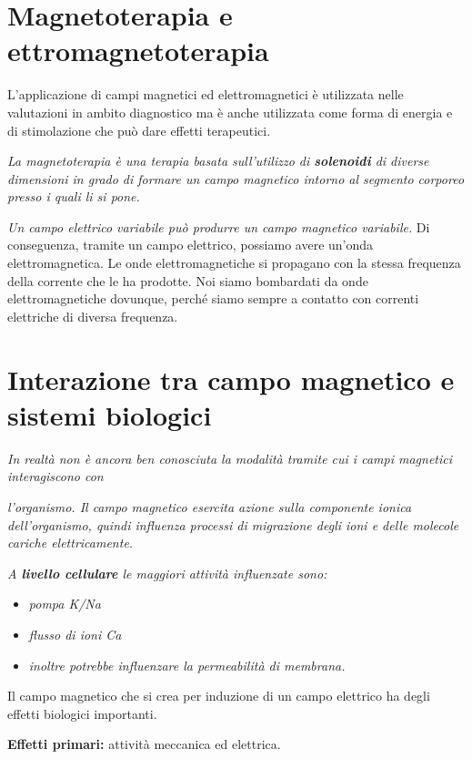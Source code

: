 \section{Magnetoterapia e ettromagnetoterapia}

L'applicazione di campi magnetici ed elettromagnetici è utilizzata nelle
valutazioni in ambito diagnostico ma è anche utilizzata come forma di
energia e di stimolazione che può dare effetti terapeutici.

\emph{La magnetoterapia è una terapia basata sull'utilizzo di
\textbf{solenoidi} di diverse dimensioni in grado di formare un campo
magnetico intorno al segmento corporeo presso i quali li si pone.}

\emph{Un campo elettrico variabile può produrre un campo magnetico
variabile.} Di conseguenza, tramite un campo elettrico, possiamo avere
un'onda elettromagnetica. Le onde elettromagnetiche si propagano con la
stessa frequenza della corrente che le ha prodotte. Noi siamo bombardati
da onde elettromagnetiche dovunque, perché siamo sempre a contatto con
correnti elettriche di diversa frequenza.

\section{Interazione tra campo magnetico e sistemi biologici}

\emph{In realtà non è ancora ben conosciuta la modalità tramite cui i
campi magnetici interagiscono con}

\emph{l'organismo. Il campo magnetico esercita azione sulla componente
ionica dell'organismo, quindi influenza processi di migrazione degli
ioni e delle molecole cariche elettricamente.}

\emph{A \textbf{livello cellulare} le maggiori attività influenzate
sono:}
\begin{itemize}

\item \emph{pompa K/Na}

\item \emph{flusso di ioni Ca}

\item \emph{inoltre potrebbe influenzare la permeabilità di membrana.}
\end{itemize}

Il campo magnetico che si crea per induzione di un campo elettrico ha
degli effetti biologici importanti.

\textbf{Effetti primari:} attività meccanica ed elettrica.

